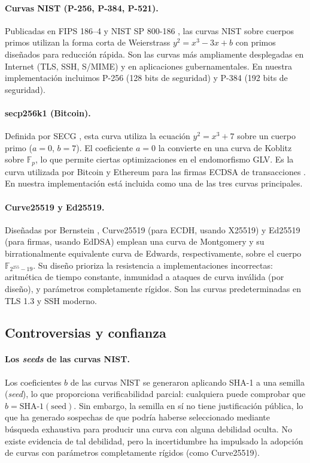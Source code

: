 \paragraph{Curvas NIST (P-256, P-384, P-521).}
Publicadas en FIPS 186--4 \cite{nist-fips186-4} y NIST SP 800-186 \cite{nist-sp800-186}, las curvas NIST sobre cuerpos primos utilizan la forma corta de Weierstrass $y^2 = x^3 - 3x + b$ con primos diseñados para reducción rápida. Son las curvas más ampliamente desplegadas en Internet (TLS, SSH, S/MIME) y en aplicaciones gubernamentales. En nuestra implementación incluimos P-256 (128 bits de seguridad) y P-384 (192 bits de seguridad).

\paragraph{secp256k1 (Bitcoin).}
Definida por SECG \cite{sec2-v2}, esta curva utiliza la ecuación $y^2 = x^3 + 7$ sobre un cuerpo primo ($a = 0$, $b = 7$). El coeficiente $a = 0$ la convierte en una curva de Koblitz sobre $\mathbb{F}_p$, lo que permite ciertas optimizaciones en el endomorfismo GLV. Es la curva utilizada por Bitcoin y Ethereum para las firmas ECDSA de transacciones \cite{secp256k1-bitcoin}. En nuestra implementación está incluida como una de las tres curvas principales.

\paragraph{Curve25519 y Ed25519.}
Diseñadas por Bernstein \cite{bernstein2006curve25519}, Curve25519 (para ECDH, usando X25519) y Ed25519 (para firmas, usando EdDSA) emplean una curva de Montgomery y su birrationalmente equivalente curva de Edwards, respectivamente, sobre el cuerpo $\mathbb{F}_{2^{255}-19}$. Su diseño prioriza la resistencia a implementaciones incorrectas: aritmética de tiempo constante, inmunidad a ataques de curva inválida (por diseño), y parámetros completamente rígidos. Son las curvas predeterminadas en TLS 1.3 y SSH moderno.


\subsection{Controversias y confianza}
\label{subsec:ecc-controversias}

\paragraph{Los \textit{seeds} de las curvas NIST.}
Los coeficientes $b$ de las curvas NIST se generaron aplicando SHA-1 a una semilla (\textit{seed}), lo que proporciona verificabilidad parcial: cualquiera puede comprobar que $b = \text{SHA-1}(\text{seed})$. Sin embargo, la semilla en sí no tiene justificación pública, lo que ha generado sospechas de que podría haberse seleccionado mediante búsqueda exhaustiva para producir una curva con alguna debilidad oculta. No existe evidencia de tal debilidad, pero la incertidumbre ha impulsado la adopción de curvas con parámetros completamente rígidos (como Curve25519).

